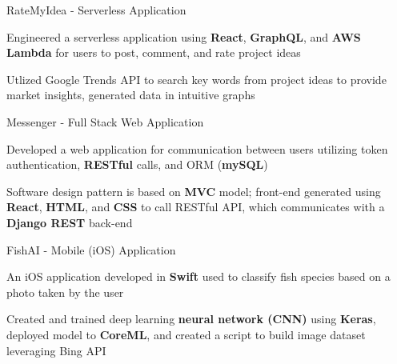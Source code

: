 \begin{siderulesProj}
\par\addvspace{-1.2ex}
\begin{cventriesproject}
  \cventryproject
  {RateMyIdea - Serverless Application}
  {
    \begin{cvskillitems}
      \item {Engineered a serverless application using \textbf{React}, \textbf{GraphQL}, and \textbf{AWS Lambda} for users to post, comment, and rate project ideas }
      \item {Utlized Google Trends API to search key words from project ideas to provide market insights, generated data in intuitive graphs }
    \end{cvskillitems}
  }
  \cventryproject
    {Messenger - Full Stack Web Application}
    {
      \begin{cvskillitems}
        \item {Developed a web application for communication between users utilizing token authentication, \textbf{RESTful} calls, and ORM (\textbf{mySQL})}
        \item {Software design pattern is based on \textbf{MVC} model; front-end generated using \textbf{React}, \textbf{HTML}, and \textbf{CSS} to call RESTful API, which communicates with a \textbf{Django REST} back-end}
      \end{cvskillitems}
    }
  \cventryproject
    {FishAI - Mobile (iOS) Application}
    {
      \begin{cvskillitems}
        \item {An iOS application developed in \textbf{Swift} used to classify fish species based on a photo taken by the user}
        \item {Created and trained deep learning \textbf{neural network (CNN)} using \textbf{Keras}, deployed model to \textbf{CoreML}, and created a script to build image dataset leveraging Bing API}
      \end{cvskillitems}
    }
\end{cventriesproject}
\end{siderulesProj}
